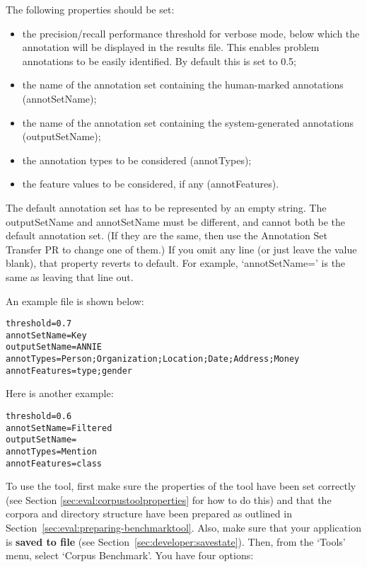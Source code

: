 The following properties should be set:
\begin{itemize}
\item the precision/recall performance threshold for verbose mode, below which
the annotation will be displayed in the results file. This enables problem
annotations to be easily identified. By default this is set to 0.5;
\item the name of the annotation set containing the human-marked
annotations (annotSetName);
\item the name of the annotation set containing the system-generated
annotations (outputSetName);
\item the annotation types to be considered (annotTypes);
\item the feature values to be considered, if any (annotFeatures).
\end{itemize}

The default annotation set has to be represented by an empty string. The
outputSetName and annotSetName must be different, and cannot both be the default
annotation set. (If they are the same, then use the Annotation Set Transfer PR to
change one of them.) If you omit any line (or just leave the value blank), that
property reverts to default. For example, `annotSetName=' is the same as leaving
that line out.

An example file is shown below:
\begin{small}
\begin{verbatim}
threshold=0.7
annotSetName=Key
outputSetName=ANNIE
annotTypes=Person;Organization;Location;Date;Address;Money
annotFeatures=type;gender
\end{verbatim}\end{small}

Here is another example:
\begin{small}
\begin{verbatim}
threshold=0.6  
annotSetName=Filtered  
outputSetName=  
annotTypes=Mention  
annotFeatures=class  
\end{verbatim}\end{small}


To use the tool, first make sure the properties of the tool have been set
correctly (see Section \ref{sec:eval:corpustoolproperties} for how to do this)
and that the corpora and directory structure have been prepared as outlined in
Section~\ref{sec:eval:preparing-benchmarktool}. Also, make sure that your
application is {\bf saved to file} (see Section~\ref{sec:developer:savestate}).
Then, from the `Tools' menu, select `Corpus Benchmark'. You have four options:

